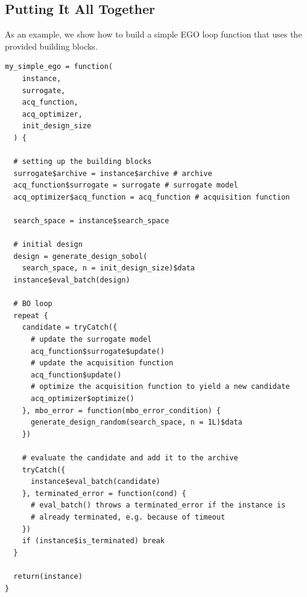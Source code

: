 \subsection*{Putting It All Together}
\label{sec:loop_function}

As an example, we show how to build a simple EGO loop function that uses the provided building blocks.

\begin{verbatim}
my_simple_ego = function(
    instance,
    surrogate,
    acq_function,
    acq_optimizer,
    init_design_size
  ) {

  # setting up the building blocks
  surrogate$archive = instance$archive # archive
  acq_function$surrogate = surrogate # surrogate model
  acq_optimizer$acq_function = acq_function # acquisition function

  search_space = instance$search_space

  # initial design
  design = generate_design_sobol(
    search_space, n = init_design_size)$data
  instance$eval_batch(design)

  # BO loop
  repeat {
    candidate = tryCatch({
      # update the surrogate model
      acq_function$surrogate$update()
      # update the acquisition function
      acq_function$update()
      # optimize the acquisition function to yield a new candidate
      acq_optimizer$optimize()
    }, mbo_error = function(mbo_error_condition) {
      generate_design_random(search_space, n = 1L)$data
    })

    # evaluate the candidate and add it to the archive
    tryCatch({
      instance$eval_batch(candidate)
    }, terminated_error = function(cond) {
      # eval_batch() throws a terminated_error if the instance is
      # already terminated, e.g. because of timeout
    })
    if (instance$is_terminated) break
  }

  return(instance)
}
\end{verbatim}